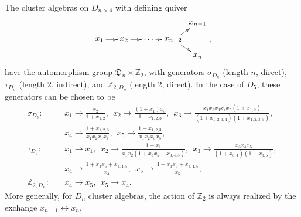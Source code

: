 \documentclass[12pt]{article}
\begin{document}
The cluster algebras on $D_{n>4}$ with defining quiver
\begin{equation}
    \begin{gathered}
    \begin{xy} 0;<1pt,0pt>:<0pt,-1pt>::
      (0,20) *+{x_1} ="1",
      (30,20) *+{x_2} ="2",
      (60,20) *+{\ldots} ="3",
      (90,20) *+{x_{n-2}} ="4",
      (120,0) *+{x_{n-1}} ="5",
      (120,40) *+{x_{n}} ="6",
      "1", {\ar"2"},
      "2", {\ar"3"},
      "3", {\ar"4"},
      "4", {\ar"5"},
      "4", {\ar"6"},
    \end{xy}
    \end{gathered},
\end{equation}
have the automorphism group ${\mathfrak D}_n \times \mathbb{Z}_2$, with generators $\sigma_{D_n}$ (length $n$, direct), $\tau_{D_n}$ (length 2, indirect), and $\mathbb{Z}_{2,D_n}$ (length 2, direct). In the case of $D_5$, these generators can be chosen to be
\vspace{.1cm}
\begin{align}
  \sigma_{D_5}:\quad 
    &x_1\to \frac{x_2}{1+x_{1,2}},~~
    x_2\to \frac{(1+x_1) x_3}{1+x_{1,2,3}},~~
    x_3\to \frac{x_1 x_2 x_3 x_4 x_5 (1+x_{1,2})}{(1+x_{1,2,3,4}) (1+x_{1,2,3,5})}, \nonumber \\
    &x_4\to \frac{1+x_{1,2,3}}{x_1 x_2 x_3 x_4},~~
    x_5\to \frac{1+x_{1,2,3}}{x_1 x_2 x_3 x_5}, \nonumber \\[2ex]
  \tau_{D_5}:\quad 
    &x_1\to x_1,~~
    x_2\to \frac{1+x_1}{x_1 x_2 (1+x_3 x_5+x_{3,4,5})},~~
    x_3\to \frac{x_3 x_4 x_5}{(1+x_{3,4}) (1+x_{3,5})},\\
    &x_4\to \frac{1+x_3 x_5+x_{3,4,5}}{x_4},~~
    x_5\to \frac{1+x_3 x_5+x_{3,4,5}}{x_5}, \nonumber \\[2ex]
    \mathbb{Z}_{2,D_n}:\quad &x_4 \to x_5,~~ x_5 \to x_4. \nonumber
\end{align}
More generally, for $D_n$ cluster algebras, the action of $\mathbb{Z}_2$ is always realized by the exchange $x_{n-1} \leftrightarrow x_n$. 
\end{document}
